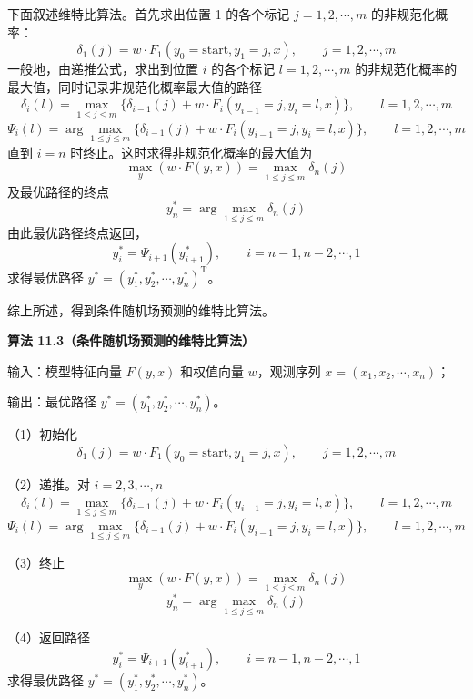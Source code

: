\documentclass[UTF8,12pt,a4paper,fontset=fandol]{ctexart}
\begin{document}
下面叙述维特比算法。首先求出位置 1 的各个标记 $j=1,2,\cdots,m$ 的非规范化概率：
\begin{equation}
\delta_1(j)=w\cdot F_1(y_0=\mathrm{start},y_1=j,x),\qquad j=1,2,\cdots,m
\tag{11.54}
\end{equation}
一般地，由递推公式，求出到位置 $i$ 的各个标记 $l=1,2,\cdots,m$ 的非规范化概率的最大值，同时记录非规范化概率最大值的路径
\begin{equation}
\delta_i(l)=\max_{1\le j\le m}\{\delta_{i-1}(j)+w\cdot F_i(y_{i-1}=j,y_i=l,x)\},\qquad l=1,2,\cdots,m
\tag{11.55}
\end{equation}
\begin{equation}
\Psi_i(l)=\arg\max_{1\le j\le m}\{\delta_{i-1}(j)+w\cdot F_i(y_{i-1}=j,y_i=l,x)\},\qquad l=1,2,\cdots,m
\tag{11.56}
\end{equation}
直到 $i=n$ 时终止。这时求得非规范化概率的最大值为
\begin{equation}
\max_y(w\cdot F(y,x))=\max_{1\le j\le m}\delta_n(j)
\tag{11.57}
\end{equation}
及最优路径的终点
\begin{equation}
y_n^*=\arg\max_{1\le j\le m}\delta_n(j)
\tag{11.58}
\end{equation}
由此最优路径终点返回，
\begin{equation}
y_i^*=\Psi_{i+1}(y_{i+1}^*),\qquad i=n-1,n-2,\cdots,1
\tag{11.59}
\end{equation}
求得最优路径 $y^*=(y_1^*,y_2^*,\cdots,y_n^*)^{\mathrm T}$。

综上所述，得到条件随机场预测的维特比算法。

\noindent\textbf{算法 11.3（条件随机场预测的维特比算法）}

输入：模型特征向量 $F(y,x)$ 和权值向量 $w$，观测序列 $x=(x_1,x_2,\cdots,x_n)$；

输出：最优路径 $y^*=(y_1^*,y_2^*,\cdots,y_n^*)$。

（1）初始化
\[
\delta_1(j)=w\cdot F_1(y_0=\mathrm{start},y_1=j,x),\qquad j=1,2,\cdots,m
\]

（2）递推。对 $i=2,3,\cdots,n$
\[
\delta_i(l)=\max_{1\le j\le m}\{\delta_{i-1}(j)+w\cdot F_i(y_{i-1}=j,y_i=l,x)\},\qquad l=1,2,\cdots,m
\]
\[
\Psi_i(l)=\arg\max_{1\le j\le m}\{\delta_{i-1}(j)+w\cdot F_i(y_{i-1}=j,y_i=l,x)\},\qquad l=1,2,\cdots,m
\]

（3）终止
\[
\max_y(w\cdot F(y,x))=\max_{1\le j\le m}\delta_n(j)
\]
\[
y_n^*=\arg\max_{1\le j\le m}\delta_n(j)
\]

（4）返回路径
\[
y_i^*=\Psi_{i+1}(y_{i+1}^*),\qquad i=n-1,n-2,\cdots,1
\]
求得最优路径 $y^*=(y_1^*,y_2^*,\cdots,y_n^*)$。
\end{document}
